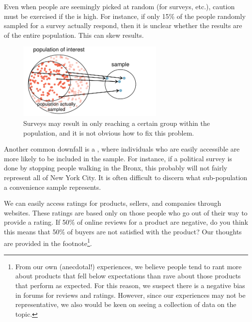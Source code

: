 Even when people are seemingly picked at random (for surveys, etc.), caution must be exercised if the  is high. For instance, if only 15\% of the people randomly sampled for a survey actually respond, then it is unclear whether the results are  of the entire population. This  can skew results.
\begin{figure}[h]
\centering
\includegraphics[height=1.5in]{01/figures/popToSample/surveySample}
\caption{Surveys may result in only reaching a certain group within the population, and it is not obvious how to fix this problem.}
\label{surveySample}
\end{figure}

Another common downfall is a , where individuals who are easily accessible are more likely to be included in the sample. For instance, if a political survey is done by stopping people walking in the Bronx, this probably will not fairly represent all of New York City. It is often difficult to discern what sub-population a convenience sample represents.

\begin{exercise}
We can easily access ratings for products, sellers, and companies through websites. These ratings are based only on those people who go out of their way to provide a rating. If 50\% of online reviews for a product are negative, do you think this means that 50\% of buyers are not satisfied with the product? Our thoughts are provided in the footnote\footnote{From our own (anecdotal!) experiences, we believe people tend to rant more about products that fell below expectations than rave about those products that perform as expected. For this reason, we suspect there is a negative bias in forums for reviews and ratings. However, since our experiences may not be representative, we also would be keen on seeing a collection of data on the topic.}.
\end{exercise}

